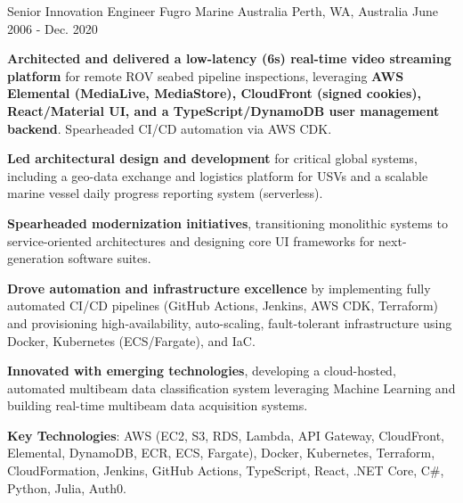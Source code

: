 

\begin{cventries}

  \cventry
    {Senior Innovation Engineer} %
    {Fugro Marine Australia} %
    {Perth, WA, Australia} %
    {June 2006 - Dec. 2020} %
    {
      \begin{cvitems} %
        \item {\textbf{Architected and delivered a low-latency (6s) real-time video streaming platform} for remote ROV seabed pipeline inspections, leveraging \textbf{AWS Elemental (MediaLive, MediaStore), CloudFront (signed cookies), React/Material UI, and a TypeScript/DynamoDB user management backend}. Spearheaded CI/CD automation via AWS CDK.}
        \item {\textbf{Led architectural design and development} for critical global systems, including a geo-data exchange and logistics platform for USVs and a scalable marine vessel daily progress reporting system (serverless).}
        \item {\textbf{Spearheaded modernization initiatives}, transitioning monolithic systems to service-oriented architectures and designing core UI frameworks for next-generation software suites.}
        \item {\textbf{Drove automation and infrastructure excellence} by implementing fully automated CI/CD pipelines (GitHub Actions, Jenkins, AWS CDK, Terraform) and provisioning high-availability, auto-scaling, fault-tolerant infrastructure using Docker, Kubernetes (ECS/Fargate), and IaC.}
        \item {\textbf{Innovated with emerging technologies}, developing a cloud-hosted, automated multibeam data classification system leveraging Machine Learning and building real-time multibeam data acquisition systems.}
        \item {\textbf{Key Technologies}: AWS (EC2, S3, RDS, Lambda, API Gateway, CloudFront, Elemental, DynamoDB, ECR, ECS, Fargate), Docker, Kubernetes, Terraform, CloudFormation, Jenkins, GitHub Actions, TypeScript, React, .NET Core, C\#, Python, Julia, Auth0.}
      \end{cvitems}
    }
\end{cventries}
